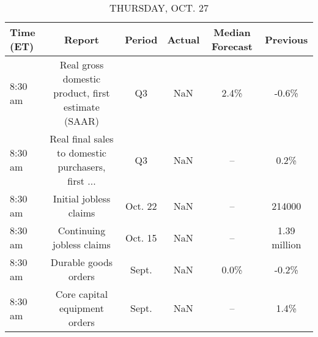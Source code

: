 \documentclass{article}%
\begin{document}
%


\begin{table}[htbp]%
\caption{THURSDAY, OCT. 27}%
\centering%
\begin{adjustbox}{width=1\textwidth}%
\begin{tabular}{lccccc}
\toprule
Time (ET) &                                             Report &  Period & Actual & Median Forecast &     Previous \\
\midrule
  8:30 am & Real gross domestic product, first estimate (SAAR) &      Q3 &    NaN &            2.4\% &        -0.6\% \\
  8:30 am & Real final sales to domestic purchasers, first ... &      Q3 &    NaN &              -- &         0.2\% \\
  8:30 am &                             Initial jobless claims & Oct. 22 &    NaN &              -- &       214000 \\
  8:30 am &                          Continuing jobless claims & Oct. 15 &    NaN &              -- & 1.39 million \\
  8:30 am &                               Durable goods orders &   Sept. &    NaN &            0.0\% &        -0.2\% \\
  8:30 am &                      Core capital equipment orders &   Sept. &    NaN &              -- &         1.4\% \\
\bottomrule
\end{tabular}
%
\end{adjustbox}%
\end{table}

%
\end{document}
